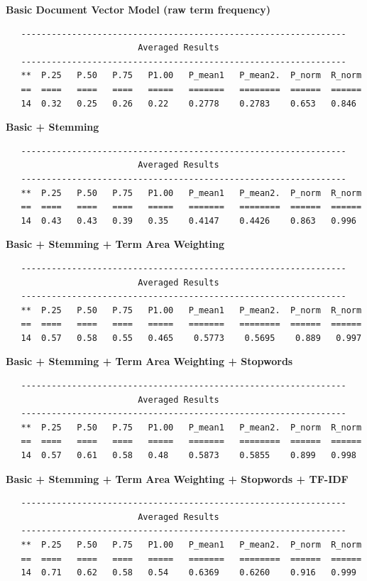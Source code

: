 \documentclass[twoside]{article}
\begin{document}
\textbf{Basic Document Vector Model (raw term frequency)}
\begin{verbatim}
   ----------------------------------------------------------------
                          Averaged Results
   ----------------------------------------------------------------
   **  P.25   P.50   P.75   P1.00   P_mean1   P_mean2.  P_norm  R_norm
   ==  ====   ====   ====   =====   =======   ========  ======  ======
   14  0.32   0.25   0.26   0.22    0.2778    0.2783    0.653   0.846
\end{verbatim}


\textbf{Basic + Stemming}
\begin{verbatim}
   ----------------------------------------------------------------
                          Averaged Results
   ----------------------------------------------------------------
   **  P.25   P.50   P.75   P1.00   P_mean1   P_mean2.  P_norm  R_norm
   ==  ====   ====   ====   =====   =======   ========  ======  ======
   14  0.43   0.43   0.39   0.35    0.4147    0.4426    0.863   0.996
\end{verbatim}

\textbf{Basic + Stemming + Term Area Weighting}
\begin{verbatim}
   ----------------------------------------------------------------
                          Averaged Results
   ----------------------------------------------------------------
   **  P.25   P.50   P.75   P1.00   P_mean1   P_mean2.  P_norm  R_norm
   ==  ====   ====   ====   =====   =======   ========  ======  ======
   14  0.57   0.58   0.55   0.465    0.5773    0.5695    0.889   0.997
\end{verbatim}


\textbf{Basic + Stemming + Term Area Weighting + Stopwords}
\begin{verbatim}
   ----------------------------------------------------------------
                          Averaged Results
   ----------------------------------------------------------------
   **  P.25   P.50   P.75   P1.00   P_mean1   P_mean2.  P_norm  R_norm
   ==  ====   ====   ====   =====   =======   ========  ======  ======
   14  0.57   0.61   0.58   0.48    0.5873    0.5855    0.899   0.998
\end{verbatim}


\textbf{Basic + Stemming + Term Area Weighting + Stopwords + TF-IDF}
\begin{verbatim}
   ----------------------------------------------------------------
                          Averaged Results
   ----------------------------------------------------------------
   **  P.25   P.50   P.75   P1.00   P_mean1   P_mean2.  P_norm  R_norm
   ==  ====   ====   ====   =====   =======   ========  ======  ======
   14  0.71   0.62   0.58   0.54    0.6369    0.6260    0.916   0.999
\end{verbatim}
\end{document}

